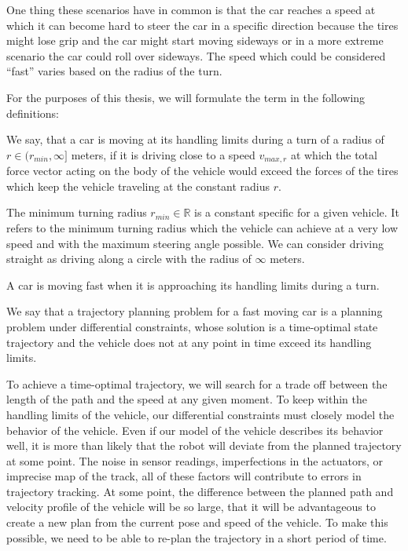 One thing these scenarios have in common is that the car reaches a speed at which it can become hard to steer the car in a specific direction because the tires might lose grip and the car might start moving sideways or in a more extreme scenario the car could roll over sideways. The speed which could be considered ``fast'' varies based on the radius of the turn.

For the purposes of this thesis, we will formulate the term in the following definitions:

\begin{defn}
	We say, that a car is moving at its handling limits during a turn of a radius of $r\in(r_{min}, \infty]$ meters, if it is driving close to a speed $v_{max,r}$ at which the total force vector acting on the body of the vehicle would exceed the forces of the tires which keep the vehicle traveling at the constant radius $r$.
\end{defn}

The minimum turning radius $r_{min}\in\mathbb{R}$ is a constant specific for a given vehicle. It refers to the minimum turning radius which the vehicle can achieve at a very low speed and with the maximum steering angle possible. We can consider driving straight as driving along a circle with the radius of $\infty$ meters.

\begin{defn}\label{def:fast_moving_car}
	A car is moving fast when it is approaching its handling limits during a turn.
\end{defn}

\begin{defn}
	We say that a trajectory planning problem for a fast moving car is a planning problem under differential constraints, whose solution is a time-optimal state trajectory and the vehicle does not at any point in time exceed its handling limits.
\end{defn}

To achieve a time-optimal trajectory, we will search for a trade off between the length of the path and the speed at any given moment. To keep within the handling limits of the vehicle, our differential constraints must closely model the behavior of the vehicle. Even if our model of the vehicle describes its behavior well, it is more than likely that the robot will deviate from the planned trajectory at some point. The noise in sensor readings, imperfections in the actuators, or imprecise map of the track, all of these factors will contribute to errors in trajectory tracking. At some point, the difference between the planned path and velocity profile of the vehicle will be so large, that it will be advantageous to create a new plan from the current pose and speed of the vehicle. To make this possible, we need to be able to re-plan the trajectory in a short period of time.

